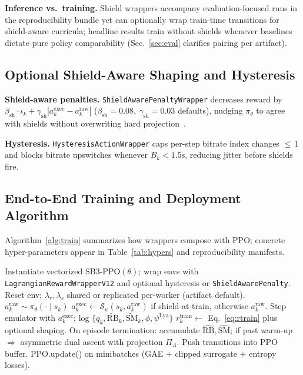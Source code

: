 \documentclass[preprint,12pt]{elsarticle}
\begin{document}
\textbf{Inference vs.\ training.}
Shield wrappers accompany evaluation-focused runs in the reproducibility bundle yet can optionally wrap train-time transitions for shield-aware curricula; headline results train without shields whenever baselines dictate pure policy comparability (Sec.~\ref{sec:eval} clarifies pairing per artifact).

\subsection{Optional Shield-Aware Shaping and Hysteresis}

\textbf{Shield-aware penalties.}
\texttt{ShieldAwarePenaltyWrapper} decreases reward by \(\beta_{\mathrm{sh}}\cdot \iota_k + \gamma_{\mathrm{sh}}|a^{\mathrm{exec}}_k-a^{\mathrm{raw}}_k|\) (\(\beta_{\mathrm{sh}}{=}0.08,\ \gamma_{\mathrm{sh}}{=}0.03\) defaults), nudging \(\pi_\theta\) to agree with shields without overwriting hard projection~\cite{alshiekh2018shielding}.

\textbf{Hysteresis.}
\texttt{HysteresisActionWrapper} caps per-step bitrate index changes \(\le\,1\) and blocks bitrate upswitches whenever \(B_k < 1.5\text{s}\), reducing jitter before shields fire.

\subsection{End-to-End Training and Deployment Algorithm}

Algorithm~\ref{alg:train} summarizes how wrappers compose with PPO; concrete hyper-parameters appear in Table~\ref{tab:hypers} and reproducibility manifests.

\begin{algorithm}[t]
\caption{Lagrangian PPO Train / Shielded Evaluate}
\label{alg:train}
\begin{algorithmic}[1]
\STATE Instantiate vectorized SB3-PPO\((\theta)\); wrap envs with \texttt{LagrangianRewardWrapperV12} and optional hysteresis or \texttt{ShieldAwarePenalty}.
        \STATE Reset env; \(\lambda_{r},\lambda_{s}\) shared or replicated per-worker (artifact default).
            \STATE \(a^{\mathrm{raw}}_k\sim\pi_\theta(\cdot\mid s_k)\)
            \STATE \(a^{\mathrm{exec}}_k \gets \mathcal{S}_{\kappa}(s_k,a^{\mathrm{raw}}_k)\) if shield-at-train, otherwise \(a^{\mathrm{raw}}_k\).
            \STATE Step emulator with \(a^{\mathrm{exec}}_k\); log \(\{q_k,\widetilde{\mathrm{RB}}_k,\widetilde{\mathrm{SM}}_k,\phi,\psi^{\mathrm{Lya}}\}\)
            \STATE \(r^{\mathrm{train}}_k \gets\) Eq.~\eqref{eq:rtrain} plus optional shaping.
        \ENDFOR
        \STATE On episode termination: accumulate \(\hat{\mathrm{RB}},\hat{\mathrm{SM}}\); if past warm-up \(\Rightarrow\) asymmetric dual ascent with projection \(\Pi_{\Lambda}\).
        \STATE Push transitions into PPO buffer.
    \ENDFOR
    \STATE PPO.update() on minibatches (GAE + clipped surrogate + entropy losses).
\ENDFOR
\end{algorithmic}
\end{algorithm}
\end{document}
